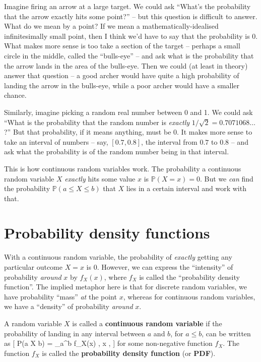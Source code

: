 \documentclass[
  letterpaper,
  DIV=11,
  numbers=noendperiod]{scrreprt}
\theoremstyle{remark}
\begin{document}
Imagine firing an arrow at a large target. We could ask ``What's the
probability that the arrow exactly hits some point?'' -- but this
question is difficult to answer. What do we mean by a point? If we mean
a mathematically-idealised infinitesimally small point, then I think
we'd have to say that the probability is 0. What makes more sense is too
take a section of the target -- perhaps a small circle in the middle,
called the ``bulls-eye'' -- and ask what is the probability that the
arrow lands in the area of the bulls-eye. Then we could (at least in
theory) answer that question -- a good archer would have quite a high
probability of landing the arrow in the bulls-eye, while a poor archer
would have a smaller chance.

Similarly, imagine picking a random real number between 0 and 1. We
could ask ``What is the probability that the random number is
\emph{exactly} \(1/\sqrt{2} = 0.7071068\dots\)?'' But that probability,
if it means anything, must be 0. It makes more sense to take an interval
of numbers -- say, \([0.7, 0.8]\), the interval from \(0.7\) to \(0.8\)
-- and ask what the probability is of the random number being in that
interval.

This is how continuous random variables work. The probability a
continuous random variable \(X\) \emph{exactly} hits some value \(x\) is
\(\mathbb P(X = x) = 0\). But we \emph{can} find the probability
\(\mathbb P(a \leq X \leq b)\) that \(X\) lies in a certain interval and
work with that.

\hypertarget{pdf}{%
\section{Probability density functions}\label{pdf}}

With a continuous random variable, the probability of \emph{exactly}
getting any particular outcome \(X = x\) is 0. However, we can express
the ``intensity'' of probability \emph{around} \(x\) by \(f_X(x)\),
where \(f_X\) is called the ``probability density function''. The
implied metaphor here is that for discrete random variables, we have
probability ``mass'' \emph{at} the point \(x\), whereas for continuous
random variables, we have a ``density'' of probability \emph{around}
\(x\).

A random variable \(X\) is called a \textbf{continuous random variable}
if the probability of landing in any interval between \(a\) and \(b\),
for \(a \leq b\), can be written as {[} \mathbb P(a \leq X \leq b) =
\int\_a\^{}b f\_X(x) , x , {]} for some non-negative function
\(f_X\). The function \(f_X\) is called the \textbf{probability density
function} (or \textbf{PDF}).
\end{document}
